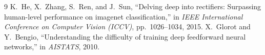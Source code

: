 \documentclass[11pt,a4paper]{article}
\theoremstyle{definition}
\begin{document}
\begin{thebibliography}{9}
 K.~He, X.~Zhang, S.~Ren, and J.~Sun, ``Delving deep into rectifiers: Surpassing human-level performance on imagenet classification,'' in \emph{IEEE International Conference on Computer Vision (ICCV)}, pp.~1026--1034, 2015.
 X.~Glorot and Y.~Bengio, ``Understanding the difficulty of training deep feedforward neural networks,'' in \emph{AISTATS}, 2010.
\end{thebibliography}
\end{document}
